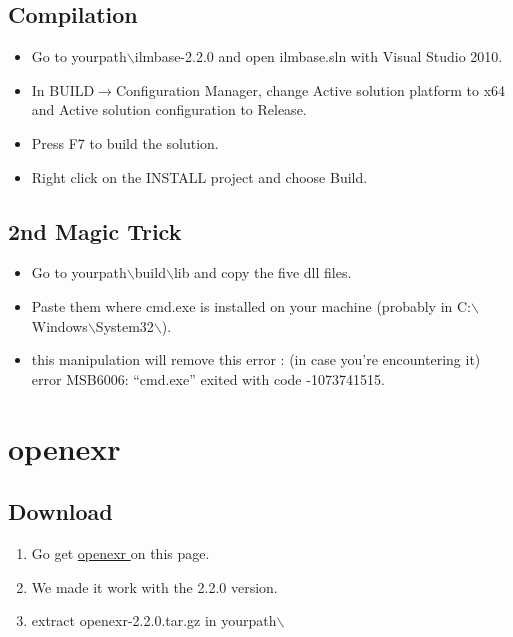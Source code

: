 \documentclass{beamer}
\begin{document}
\subsection{Compilation}
\begin{frame}
  \begin{itemize}
    \item Go to yourpath$\backslash$ilmbase-2.2.0 and open ilmbase.sln with Visual Studio 2010.
    \item In BUILD$\rightarrow$Configuration Manager, change Active solution platform to x64 and Active solution configuration to Release.
    \item Press F7 to build the solution.
    \item Right click on the INSTALL project and choose Build.
  \end{itemize}
\end{frame}

\subsection{2nd Magic Trick}
\begin{frame}
  \begin{itemize}
    \item Go to yourpath$\backslash$build$\backslash$lib and copy the five dll files.
    \item Paste them where cmd.exe is installed on your machine (probably in C:$\backslash$Windows$\backslash$System32$\backslash$).
    \item this manipulation will remove this error : (in case you're encountering it) \\
    error MSB6006: ``cmd.exe'' exited with code -1073741515.
  \end{itemize}
\end{frame}

\section{openexr}
\subsection{Download}
\begin{frame}
  \begin{enumerate}
    \item Go get \color{blue}\href{http://www.openexr.com/downloads.html/}{openexr }\color{black} on this page.
    \item We made it work with the 2.2.0 version.
    \item extract openexr-2.2.0.tar.gz in yourpath$\backslash$
  \end{enumerate}
\end{frame}
\end{document}
